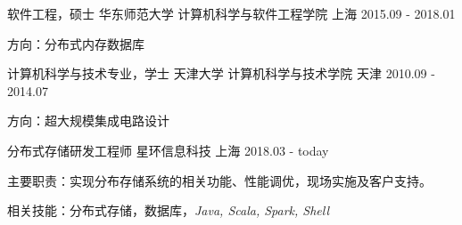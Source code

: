 \begin{cventries}
  \cventry
    {软件工程，硕士}
    {华东师范大学 \quad 计算机科学与软件工程学院}
    {上海}
    {2015.09 - 2018.01}
    {
      \begin{cvitems}
        \item {方向：分布式内存数据库}
      \end{cvitems}
    }
    \cventry
    {计算机科学与技术专业，学士}
    {天津大学 \quad 计算机科学与技术学院}
    {天津}
    {2010.09 - 2014.07}
    {
      \begin{cvitems}
        \item {方向：超大规模集成电路设计}
      \end{cvitems}
    }
\end{cventries}
\begin{cventries}
  \cventry
    {分布式存储研发工程师}
    {星环信息科技}
    {上海}
    {2018.03 - today}
    {
      \begin{cvitems}
        \item {主要职责：实现分布存储系统的相关功能、性能调优，现场实施及客户支持。}
        \item {相关技能：分布式存储，数据库，\it{Java, Scala, Spark, Shell}}
      \end{cvitems}
    }
\end{cventries}
